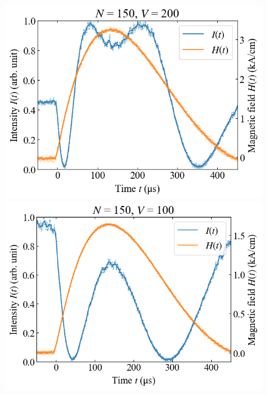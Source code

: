 \documentclass[9pt,dvipdfmx,a4paper]{jsarticle}
\begin{document}
\begin{figure}[H]
\begin{minipage}[t]{0.24\columnwidth}
        \includegraphics[width = \columnwidth]{xt/19.png}
    \end{minipage}
    \hfill
    \begin{minipage}[t]{0.24\columnwidth}
        \centering
        \includegraphics[width = \columnwidth]{xt/20.png}
    \end{minipage}
\end{figure}
\end{document}
